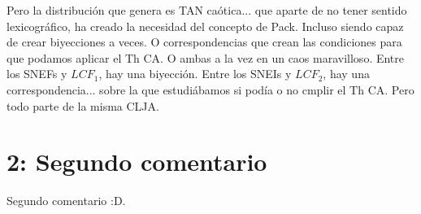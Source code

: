 Pero la distribución que genera es TAN caótica... que aparte de no tener sentido lexicográfico, ha creado la necesidad del concepto de Pack. Incluso siendo capaz de crear biyecciones a veces. O correspondencias que crean las condiciones para que podamos aplicar el Th CA. O ambas a la vez en un caos maravilloso. Entre los SNEFs y $LCF_{1}$, hay una biyección. Entre los SNEIs y $LCF_{2}$, hay una correspondencia... sobre la que estudiábamos si podía o no cmplir el Th CA. Pero todo parte de la misma CLJA.   

\newpage

\section {2: Segundo comentario}

Segundo comentario :D.

\newpage